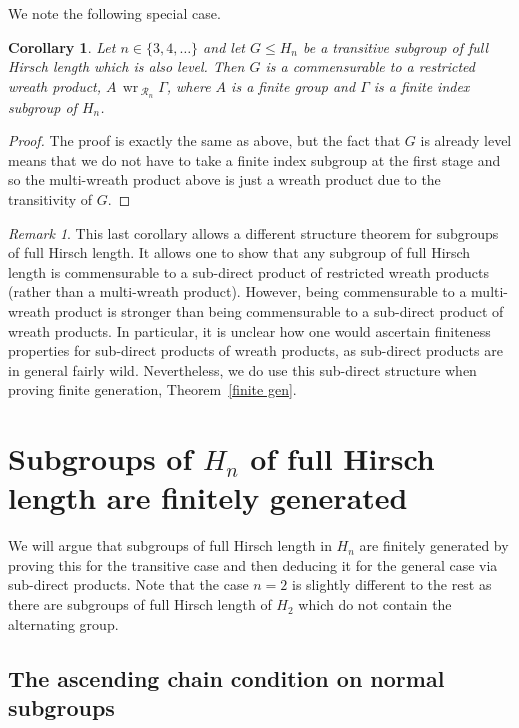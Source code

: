 \documentclass[11pt,a4paper]{amsart}
\newtheorem{corollary}[theorem]{Corollary}
\theoremstyle{definition}
\theoremstyle{remark}
\newtheorem{remark}[theorem]{Remark}
\newcommand{\Ra}{\mathcal{R}}
\renewcommand{\wr}{\operatorname{\,wr\,}}
\begin{document}
We note the following special case. 


\begin{corollary} \label{level and wreath}
	Let $n\in \{3, 4, \ldots\}$ and let $G \leq H_n$ be a transitive subgroup of full Hirsch length which is also level. Then $G$ is a commensurable to a restricted wreath product, $A \wr_{\Ra_n} \Gamma$, where $A$ is a finite group and $\Gamma$ is a finite index subgroup of $H_n$.  
\end{corollary}
\begin{proof}
The proof is exactly the same as above, but the fact that $G$ is already level means that we do not have to take a finite index subgroup at the first stage and so the multi-wreath product above is just a wreath product due to the transitivity of $G$. 
\end{proof}



\begin{remark}
	This last corollary allows a different structure theorem for subgroups of full Hirsch length. It allows one to show that any subgroup of full Hirsch length is commensurable to a sub-direct product of restricted wreath products (rather than a multi-wreath product). However, being commensurable to a multi-wreath product is stronger than being commensurable to a sub-direct product of wreath products. In particular, it is unclear how one would ascertain finiteness properties for sub-direct products of wreath products, as sub-direct products are in general fairly wild. Nevertheless, we do use this sub-direct structure when proving finite generation, Theorem~\ref{finite gen}. 
\end{remark}


\section{Subgroups of \texorpdfstring{$H_n$ } \   of full Hirsch length are finitely generated}\label{sec:n=2}


We will argue that subgroups of full Hirsch length in $H_n$ are finitely generated by proving this for the transitive case and then deducing it for the general case via sub-direct products. Note that the case $n=2$ is slightly different to the rest as there are subgroups of full Hirsch length of $H_2$ which do not contain the alternating group. 

\subsection*{The ascending chain condition on normal subgroups}
\end{document}
